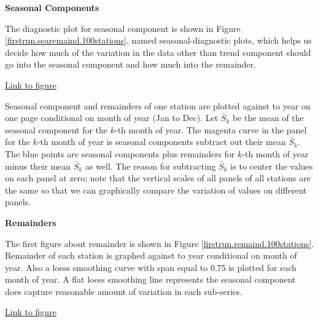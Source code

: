 \textbf{Seasonal Components}

The diagnostic plot for seasonal component is shown in Figure 
\href{../plots/100stations/first_run/sea+remaind.month.100stations.tmax.pdf}
{\ref*{firstrun.searemaind.100stations}}, named seasonal-diagnostic plots, which
helps us decide how much of the variation in the data other than trend component
should go into the seasonal component and how much into the remainder.

\begin{framed}
\begin{center}
  \href{../plots/100stations/first_run/sea+remaind.month.100stations.tmax.pdf}
  {Link to figure}
  \label{firstrun.searemaind.100stations}
\end{center}
\end{framed}

Seasonal component and remainders of
one station are plotted against to year on one page conditional on month of year
(Jan to Dec). Let $\bar S_k$ be the mean of the seasonal component for the $k$-th 
month of year. The magenta curve in the panel for the $k$-th month of year is 
seasonal components subtract out their mean $\bar S_k$. The blue points are seasonal
components plus remainders for $k$-th month of year minus their mean $\bar S_k$ 
as well. The reason for subtracting $\bar S_k$ is to center the values on each 
panel at zero; note that the vertical scales of all panels of all stations are 
the same so that we can graphically compare the variation of values on different 
panels.

\textbf{Remainders}

The first figure about remainder is shown in Figure 
\href{../plots/100stations/first_run/remainder.month.100stations.tmax.pdf}
{\ref*{firstrun.remaind.100stations}}. Remainder of each station is graphed against
to year conditional on month of year. Also a loess smoothing curve with span equal
to 0.75 is plotted for each month of year. A flat loess smoothing line represents
the seasonal component does capture reasonable amount of variation in each 
sub-series.

\begin{framed}
\begin{center}
  \href{../plots/100stations/first_run/remainder.month.100stations.tmax.pdf}
  {Link to figure}
  \label{firstrun.remaind.100stations}
\end{center}
\end{framed}

